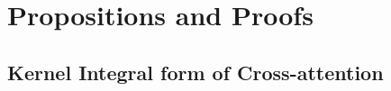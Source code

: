 \newpage
\section{Propositions and Proofs}


\subsection{Kernel Integral form of Cross-attention}
\label{app:kernel}

